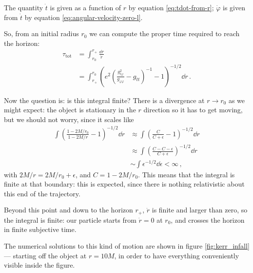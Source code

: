 \documentclass[main.tex]{subfiles}
\begin{document}
The quantity \(\dot{t}\) is given as a function of \(r\) by equation \eqref{eq:tdot-from-r}; \(\dot{\varphi}\) is given from \(\dot{t}\) by equation \eqref{eq:angular-velocity-zero-l}. 

So, from an initial radius \(r_0 \) we can compute the proper time required to reach the horizon: 
%
\begin{align}
\tau _{\text{tot}} &= \int_{r_0}^{r_+} \frac{ \dd{r}}{\dot{r}}  \\
&= \int_{r_+}^{r_0} \left(e^2 \left(\frac{g_{t \varphi }^2}{g_{\varphi \varphi }} - g_{tt}\right)^{-1} - 1\right)^{-1/2} \dd{r} 
\,.
\end{align}

Now the question is: is this integral finite? 
There is a divergence at \(r \to r_0 \) as we might expect: the object is stationary in the \(r\) direction so it has to get moving, but we should not worry, since it scales like 
%
\begin{align}
\int \left(\frac{1 - 2M / r_0 }{1 - 2M / r} -1 \right)^{-1/2} \dd{r} &\approx \int \left(\frac{C }{C+ \epsilon } -1 \right)^{-1/2} \dd{r}  \\
&\approx \int \left(\frac{C - C - \epsilon }{C + \epsilon } \right)^{-1/2} \dd{r}  \\
&\sim \int \epsilon^{-1/2} \dd{\epsilon } < \infty 
\,,
\end{align}
%
with \(2M/r = 2M/r_0 + \epsilon \), and \(C = 1 - 2M/r_0 \).
This means that the integral is finite at that boundary: this is expected, since there is nothing relativistic about this end of the trajectory.

Beyond this point and down to the horizon \(r_+\), \(\dot{r}\) is finite and larger than zero, so the integral is finite: our particle starts from \(\dot{r} = 0\) at \(r_0 \), and crosses the horizon in finite subjective time.


The numerical solutions to this kind of motion are shown in figure \ref{fig:kerr_infall} --- starting off the object at \(r = 10M\), in order to have everything conveniently visible inside the figure.
\end{document}

